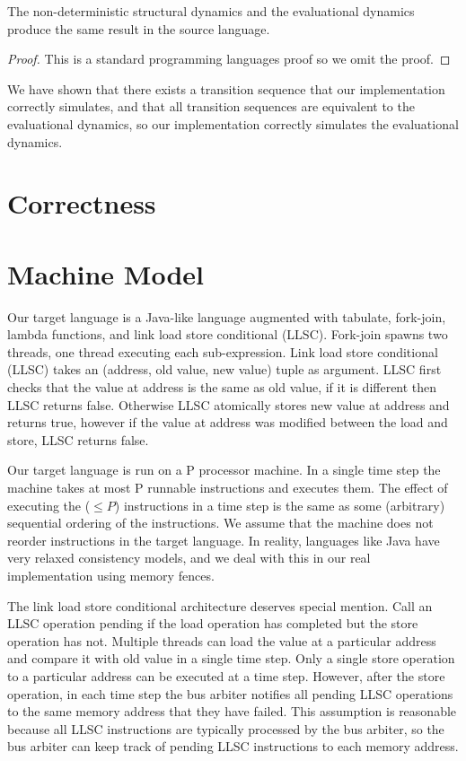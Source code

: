 \documentclass[preprint]{sigplanconf}
\begin{document}
\begin{theorem}
The non-deterministic structural dynamics and the evaluational dynamics produce the same result in the source language.
\end{theorem}

\begin{proof}
This is a standard programming languages proof so we omit the proof.
\end{proof}

We have shown that there exists a transition sequence that our implementation correctly simulates, and that all transition sequences are equivalent to the evaluational dynamics, so our implementation correctly simulates the evaluational dynamics.

\section{Correctness}

\section{Machine Model}

Our target language is a Java-like language augmented with tabulate, fork-join, lambda functions, and link load store conditional (LLSC). Fork-join spawns two threads, one thread executing each sub-expression. Link load store conditional (LLSC) takes an (address, old value, new value) tuple as argument. LLSC first checks that the value at address is the same as old value, if it is different then LLSC returns false. Otherwise LLSC atomically stores new value at address and returns true, however if the value at address was modified between the load and store, LLSC returns false.

Our target language is run on a P processor machine. In a single time step the machine takes at most P runnable instructions and executes them.  The effect of executing the ($\leq P$) instructions in a time step is the same as some (arbitrary) sequential ordering of the instructions. We assume that the machine does not reorder instructions in the target language. In reality, languages like Java have very relaxed consistency models, and we deal with this in our real implementation using memory fences.

The link load store conditional architecture deserves special mention. Call an LLSC operation pending if the load operation has completed but the store operation has not. Multiple threads can load the value at a particular address and compare it with old value in a single time step. Only a single store operation to a particular address can be executed at a time step. However, after the store operation, in each time step the bus arbiter notifies all pending LLSC operations to the same memory address that they have failed. This assumption is reasonable because all LLSC instructions are typically processed by the bus arbiter, so the bus arbiter can keep track of pending LLSC instructions to each memory address.







\end{document}
